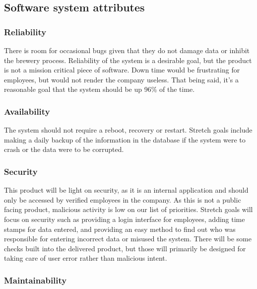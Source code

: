 \documentclass[draftclsnofoot,onecolumn,letterpaper,10pt,compsoc]{IEEEtran}
\begin{document}
	\subsection{Software system attributes}
		\subsubsection{Reliability}

		There is room for occasional bugs given that they do not damage data or inhibit the brewery process.
		Reliability of the system is a desirable goal, but the product is not a mission critical piece of software.
		Down time would be frustrating for employees, but would not render the company useless.
		That being said, it’s a reasonable goal that the system should be up 96\% of the time.

		\subsubsection{Availability}

		The system should not require a reboot, recovery or restart.
		Stretch goals include making a daily backup of the information in the database if the system were to crash or the data were to be corrupted.

		\subsubsection{Security}

		This product will be light on security, as it is an internal application and should only be accessed by verified employees in the company.
		As this is not a public facing product, malicious activity is low on our list of priorities.
		Stretch goals will focus on security such as providing a login interface for employees, adding time stamps for data entered, and providing an easy method to find out who was responsible for entering incorrect data or misused the system.
		There will be some checks built into the delivered product, but those will primarily be designed for taking care of user error rather than malicious intent.

		\subsubsection{Maintainability}
\end{document}
